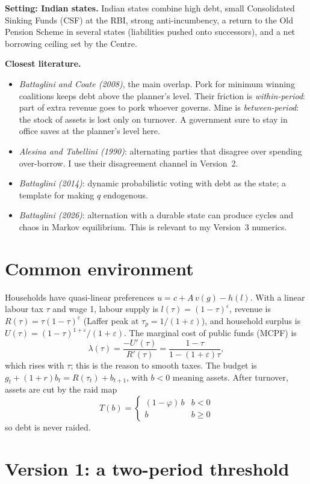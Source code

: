 \documentclass[11pt]{article}
\begin{document}
\textbf{Setting: Indian states.} Indian states combine high debt, small Consolidated Sinking Funds (CSF) at the RBI, strong anti-incumbency, a return to the Old Pension Scheme in several states (liabilities pushed onto successors), and a net borrowing ceiling set by the Centre.

\textbf{Closest literature.}
\begin{itemize}
\item \emph{Battaglini and Coate (2008)}, the main overlap. Pork for minimum winning coalitions keeps debt above the planner's level. Their friction is \emph{within-period}: part of extra revenue goes to pork whoever governs. Mine is \emph{between-period}: the stock of assets is lost only on turnover. A government sure to stay in office saves at the planner's level here.
\item \emph{Alesina and Tabellini (1990)}: alternating parties that disagree over spending over-borrow. I use their disagreement channel in Version~2.
\item \emph{Battaglini (2014)}: dynamic probabilistic voting with debt as the state; a template for making $q$ endogenous.
\item \emph{Battaglini (2026)}: alternation with a durable state can produce cycles and chaos in Markov equilibrium. This is relevant to my Version~3 numerics.
\end{itemize}

\section{Common environment}

Households have quasi-linear preferences $u=c+A\,v(g)-h(l)$. With a linear labour tax $\tau$ and wage 1, labour supply is $l(\tau)=(1-\tau)^{\varepsilon}$, revenue is $R(\tau)=\tau(1-\tau)^{\varepsilon}$ (Laffer peak at $\tau_p=1/(1+\varepsilon)$), and household surplus is $U(\tau)=(1-\tau)^{1+\varepsilon}/(1+\varepsilon)$. The marginal cost of public funds (MCPF) is
\[
\lambda(\tau)=\frac{-U'(\tau)}{R'(\tau)}=\frac{1-\tau}{1-(1+\varepsilon)\tau},
\]
which rises with $\tau$; this is the reason to smooth taxes. The budget is $g_t+(1+r)b_t=R(\tau_t)+b_{t+1}$, with $b<0$ meaning assets. After turnover, assets are cut by the raid map
\[
T(b)=\begin{cases}(1-\varphi)\,b & b<0\\ b & b\ge 0\end{cases}
\]
so debt is never raided.

\section{Version 1: a two-period threshold}
\end{document}
